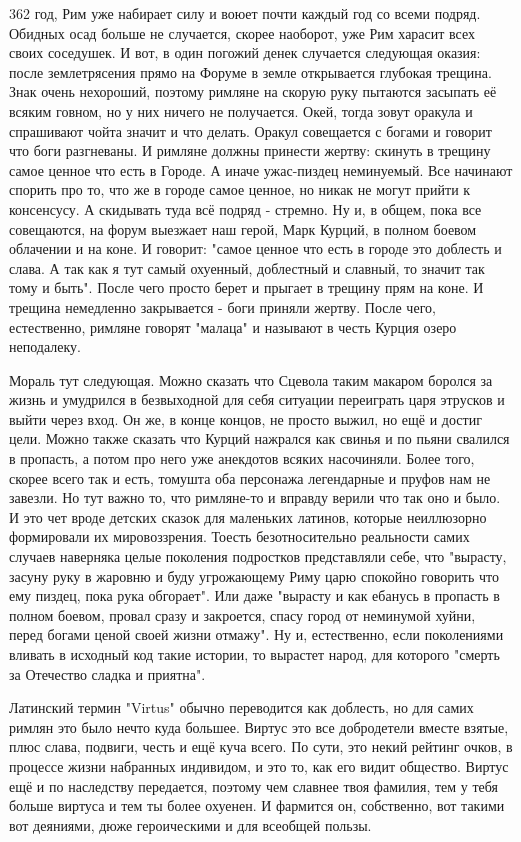 362 год, Рим уже набирает силу и воюет почти каждый год со всеми подряд. Обидных осад больше не случается, скорее наоборот, уже Рим харасит всех своих соседушек. И вот, в один погожий денек случается следующая оказия: после землетрясения прямо на Форуме в земле открывается глубокая трещина. Знак очень нехороший, поэтому римляне на скорую руку пытаются засыпать её всяким говном, но у них ничего не получается. Окей, тогда зовут оракула и спрашивают чойта значит и что делать. Оракул совещается с богами и говорит что боги разгневаны. И римляне должны принести жертву: скинуть в трещину самое ценное что есть в Городе. А иначе ужас-пиздец неминуемый. Все начинают спорить про то, что же в городе самое ценное, но никак не могут прийти к консенсусу. А скидывать туда всё подряд - стремно. Ну и, в общем, пока все совещаются, на форум выезжает наш герой, Марк Курций, в полном боевом облачении и на коне. И говорит: "самое ценное что есть в городе это доблесть и слава. А так как я тут самый охуенный, доблестный и славный, то значит так тому и быть". После чего просто берет и прыгает в трещину прям на коне. И трещина немедленно закрывается - боги приняли жертву. После чего, естественно, римляне говорят "малаца" и называют в честь Курция озеро неподалеку.


Мораль тут следующая. Можно сказать что Сцевола таким макаром боролся за жизнь и умудрился в безвыходной для себя ситуации переиграть царя этрусков и выйти через вход. Он же, в конце концов, не просто выжил, но ещё и достиг цели. Можно также сказать что Курций нажрался как свинья и по пьяни свалился в пропасть, а потом про него уже анекдотов всяких насочиняли. Более того, скорее всего так и есть, томушта оба персонажа легендарные и пруфов нам не завезли. Но тут важно то, что римляне-то и вправду верили что так оно и было. И это чет вроде детских сказок для маленьких латинов, которые неиллюзорно формировали их мировоззрения. Тоесть безотносительно реальности самих случаев наверняка целые поколения подростков представляли себе, что "вырасту, засуну руку в жаровню и буду угрожающему Риму царю спокойно говорить что ему пиздец, пока рука обгорает". Или даже "вырасту и как ебанусь в пропасть в полном боевом, провал сразу и закроется, спасу город от неминумой хуйни, перед богами ценой своей жизни отмажу". Ну и, естественно, если поколениями вливать в исходный код такие истории, то вырастет народ, для которого "смерть за Отечество сладка и приятна".


Латинский термин "Virtus" обычно переводится как доблесть, но для самих римлян это было нечто куда большее. Виртус это все добродетели вместе взятые, плюс слава, подвиги, честь и ещё куча всего. По сути, это некий рейтинг очков, в процессе жизни набранных индивидом, и это то, как его видит общество. Виртус ещё и по наследству передается, поэтому чем славнее твоя фамилия, тем у тебя больше виртуса и тем ты более охуенен. И фармится он, собственно, вот такими вот деяниями, дюже героическими и для всеобщей пользы.


